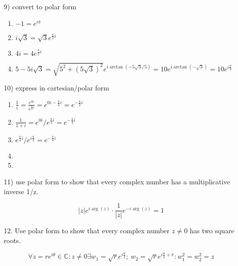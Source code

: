 \documentclass{book}
\begin{document}
\begin{enumerate}

\item[9)] convert to polar form

\begin{enumerate}[label=(\alph*)]
\item $-1=e^{i\pi}$
\item $i\sqrt{3}=\sqrt{3}e^{\frac{\pi}{2}i}$
\item $4i=4e^{\frac{\pi}{2}i}$
\item $5-5i\sqrt{3}=\sqrt{5^2+(5\sqrt{3})^2}e^{i\arctan(-5\sqrt{3}/5)}=10e^{i\arctan(-\sqrt{3})}=10e^{i\frac{\pi}{3}}$
\end{enumerate}

\item[10)] express in cartesian/polar form

\begin{enumerate}[label=(\alph*)]
\item $\frac{1}{i}=\frac{e^{0i}}{e^{\frac{\pi}{2}i}}=e^{0i-\frac{\pi}{4}i}=e^{-\frac{\pi}{2}i}$
\item $\frac{1}{1+i}=e^{0i}/e^{\frac{\pi}{4}i}=e^{-\frac{\pi}{4}i}$
\item $e^{\frac{\pi}{4}i}/e^{i\frac{\pi}{2}}=e^{-\frac{\pi}{4}i}$
\item 
\item
\end{enumerate}

\item[11)] use polar form to show that every complex number has a multiplicative inverse 1/z.

\[|z|e^{i\arg(z)}\cdot\frac{1}{|z|}e^{-i\arg(z)}=1\]

\item[12.] Use polar form to show that every complex number $z\neq0$ has two square roots.

\[\forall z=re^{i\theta}\in\mathbb{C}:z\neq0\exists w_1=\sqrt{r}e^{i\frac{\theta}{2}};\ w_2=\sqrt{r}e^{i\frac{\theta}{2}+\pi}:w_1^2=w_2^2=z\]

\end{enumerate}
\end{document}
